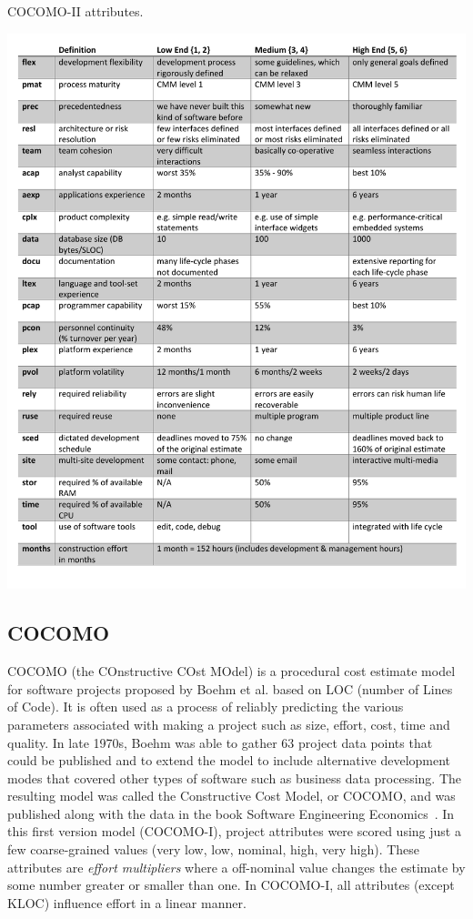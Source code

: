 \documentclass[sigconf,review]{acmart}
\begin{document}



\begin{table}
\caption{COCOMO-II attributes.}
\label{tbl:cparems}
\centerline{\includegraphics[width=.7\textwidth]{cocomo_para.pdf}}
\end{table}



\subsection{COCOMO}
\label{sec:coco}

COCOMO (the COnstructive COst MOdel) is a procedural cost estimate model for software projects proposed by Boehm et al. based on LOC (number of Lines of Code). It is often used as a process of reliably predicting the various parameters associated with making a project such as size, effort, cost, time and quality. In late 1970s, Boehm was able to gather 63 project data points that could be published and to extend the model to
include alternative development modes that covered
other types of software such as business data
processing.  The resulting model was called the
Constructive Cost Model, or COCOMO, and was
published along with the data in the book Software
Engineering Economics~\cite{boehm1981software}. 
In this first version model (COCOMO-I), project attributes
were scored using just a few coarse-grained values (very low,
low, nominal, high, very high). These attributes
are {\em effort multipliers} where
a off-nominal value changes the estimate by some number
greater or smaller than one.
In COCOMO-I, all attributes (except KLOC)
influence effort in a linear manner.
\end{document}
